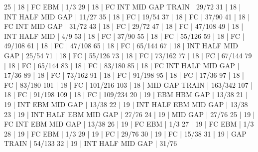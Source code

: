 25    |  18    |    FC             EBM                        | 1/3   
29    |  18    |    FC  INT                  MID  GAP  TRAIN  | 29/72   
31    |  18    |        INT  HALF            MID  GAP         | 11/27   
35    |  18    |    FC                                        | 19/54   
37    |  18    |    FC                                        | 37/90   
41    |  18    |    FC  INT                  MID  GAP         | 31/72   
43    |  18    |    FC                                        | 29/72   
47    |  18    |    FC                                        | 47/108   
49    |  18    |        INT  HALF            MID              | 4/9   
53    |  18    |    FC                                        | 37/90   
55    |  18    |    FC                                        | 55/126   
59    |  18    |    FC                                        | 49/108   
61    |  18    |    FC                                        | 47/108   
65    |  18    |    FC                                        | 65/144   
67    |  18    |        INT  HALF            MID  GAP         | 25/54   
71    |  18    |    FC                                        | 55/126   
73    |  18    |    FC                                        | 73/162   
77    |  18    |    FC                                        | 67/144   
79    |  18    |    FC                                        | 65/144   
83    |  18    |    FC                                        | 83/180   
85    |  18    |    FC  INT  HALF            MID  GAP         | 17/36   
89    |  18    |    FC                                        | 73/162   
91    |  18    |    FC                                        | 91/198   
95    |  18    |    FC                                        | 17/36   
97    |  18    |    FC                                        | 83/180   
101   |  18    |    FC                                        | 101/216   
103   |  18    |                             MID  GAP  TRAIN  | 163/342   
107   |  18    |    FC                                        | 91/198   
109   |  18    |    FC                                        | 109/234   
20    |  19    |                   EBM  HBM       GAP         | 13/38   
21    |  19    |        INT        EBM       MID  GAP         | 13/38   
22    |  19    |        INT  HALF  EBM       MID  GAP         | 13/38   
23    |  19    |        INT  HALF  EBM       MID  GAP         | 27/76   
24    |  19    |                             MID  GAP         | 27/76   
25    |  19    |    FC  INT        EBM       MID  GAP         | 13/38   
26    |  19    |    FC             EBM                        | 1/3   
27    |  19    |    FC             EBM                        | 1/3   
28    |  19    |    FC             EBM                        | 1/3   
29    |  19    |    FC                                        | 29/76   
30    |  19    |    FC                                        | 15/38   
31    |  19    |                                  GAP  TRAIN  | 54/133   
32    |  19    |        INT  HALF            MID  GAP         | 31/76